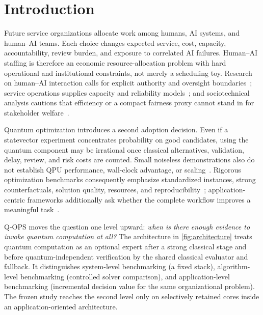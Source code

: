 \section{Introduction}
\label{sec:introduction}

Future service organizations allocate work among humans, AI systems, and human--AI teams. Each choice changes expected service, cost, capacity, accountability, review burden, and exposure to correlated AI failures. Human--AI staffing is therefore an economic resource-allocation problem with hard operational and institutional constraints, not merely a scheduling toy. Research on human--AI interaction calls for explicit authority and oversight boundaries~\citep{amershi2019humanai,seeber2020machines}; service operations supplies capacity and reliability models~\citep{gans2003callcenters}; and sociotechnical analysis cautions that efficiency or a compact fairness proxy cannot stand in for stakeholder welfare~\citep{selbst2019fairness}.

Quantum optimization introduces a second adoption decision. Even if a statevector experiment concentrates probability on good candidates, using the quantum component may be irrational once classical alternatives, validation, delay, review, and risk costs are counted. Small noiseless demonstrations also do not establish QPU performance, wall-clock advantage, or scaling~\citep{preskill2018nisq,cerezo2021variational,bharti2022nisq}. Rigorous optimization benchmarks consequently emphasize standardized instances, strong counterfactuals, solution quality, resources, and reproducibility~\citep{koch2026qoblib}; application-centric frameworks additionally ask whether the complete workflow improves a meaningful task~\citep{finzgar2022quark}.

Q-OPS moves the question one level upward: \emph{when is there enough evidence to invoke quantum computation at all?} The architecture in \cref{fig:architecture} treats quantum computation as an optional expert after a strong classical stage and before quantum-independent verification by the shared classical evaluator and fallback. It distinguishes system-level benchmarking (a fixed stack), algorithm-level benchmarking (controlled solver comparison), and application-level benchmarking (incremental decision value for the same organizational problem). The frozen study reaches the second level only on selectively retained cores inside an application-oriented architecture.



